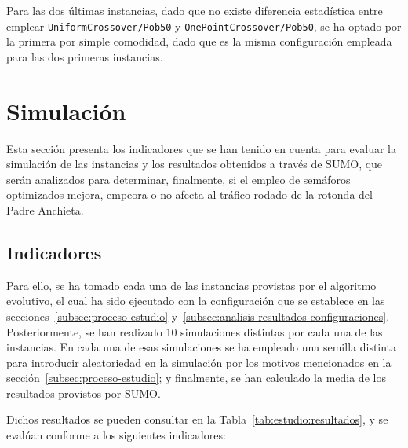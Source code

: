 Para las dos últimas instancias, dado que no existe diferencia estadística entre emplear \texttt{UniformCrossover/Pob50} y \texttt{OnePointCrossover/Pob50}, se ha optado por la primera por simple comodidad, dado que es la misma configuración empleada para las dos primeras instancias.


\section{Simulación}

Esta sección presenta los indicadores que se han tenido en cuenta para evaluar la simulación de las instancias y los resultados obtenidos a través de SUMO, que serán analizados para determinar, finalmente, si el empleo de semáforos optimizados mejora, empeora o no afecta al tráfico rodado de la rotonda del Padre Anchieta.

\subsection{Indicadores}

Para ello, se ha tomado cada una de las instancias provistas por el algoritmo evolutivo, el cual ha sido ejecutado con la configuración que se establece en las secciones~\ref{subsec:proceso-estudio} y~\ref{subsec:analisis-resultados-configuraciones}. Posteriormente, se han realizado 10 simulaciones distintas por cada una de las instancias. En cada una de esas simulaciones se ha empleado una semilla distinta para introducir aleatoriedad en la simulación por los motivos mencionados en la sección~\ref{subsec:proceso-estudio}; y finalmente, se han calculado la media de los resultados provistos por SUMO.

Dichos resultados se pueden consultar en la Tabla~\ref{tab:estudio:resultados}, y se evalúan conforme a los siguientes indicadores:

